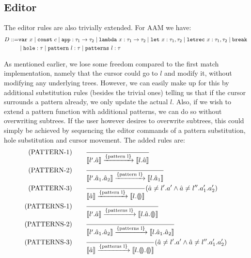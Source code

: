 \documentclass[10pt,a4paper,english]{article}
\begin{document}
\subsection{Editor}
The editor rules are also trivially extended. For AAM we have:
\begin{align}
  D ::= &\texttt{var}~x
  \mid \texttt{const}~c
  \mid \texttt{app} : \tau_1\to\tau_2
  \mid \texttt{lambda}~x : \tau_1\to\tau_2
  \mid \texttt{let}~x : \tau_1,\tau_2
  \mid \texttt{letrec}~x : \tau_1,\tau_2
  \mid \texttt{break}\\
  &\mid \texttt{hole} : \tau
  \mid\texttt{pattern}~l : \tau
  \mid\texttt{patterns}~l : \tau
\end{align}

As mentioned earlier, we lose some freedom compared to the first match implementation, namely that the cursor could go to $l$ and modify it, without modifying any underlying trees. However, we can easily make up for this by additional substitution rules (besides the trivial ones) telling us that if the cursor surrounds a pattern already, we only update the actual $l$. Also, if we wish to extend a pattern function with additional patterns, we can do so without overwriting subtrees. If the user however desires to overwrite subtrees, this could simply be achieved by sequencing the editor commands of a pattern substitution, hole substitution and cursor movement. The added rules are:
\begin{align}
(\text{PATTERN-1})\qquad
&\frac{}{\llbracket l'.\hat{a} \rrbracket\xrightarrow[]{\text{\{pattern l\}}}\llbracket l.\hat{a} \rrbracket}\\
(\text{PATTERN-2})\qquad
&\frac{}{\llbracket l'.\hat{a}_1.\hat{a}_2 \rrbracket\xrightarrow[]{\text{\{pattern l\}}}\llbracket l.\hat{a}_1 \rrbracket}\\
(\text{PATTERN-3})\qquad
&\frac{}{\llbracket \hat{a} \rrbracket\xrightarrow[]{\text{\{pattern l\}}}\llbracket l.\llparenthesis\rrparenthesis \rrbracket}(\hat{a}\neq l'.a' \land \hat{a}\neq l''.a_1'.a_2')\\
(\text{PATTERNS-1})\qquad
&\frac{}{\llbracket l'.\hat{a} \rrbracket\xrightarrow[]{\text{\{patterns l\}}}\llbracket l.\hat{a}.\llparenthesis\rrparenthesis \rrbracket}\\
(\text{PATTERNS-2})\qquad
&\frac{}{\llbracket l'.\hat{a}_1.\hat{a}_2 \rrbracket\xrightarrow[]{\text{\{patterns l\}}}\llbracket l.\hat{a}_1.\hat{a}_2 \rrbracket}\\
(\text{PATTERNS-3})\qquad
&\frac{}{\llbracket \hat{a} \rrbracket\xrightarrow[]{\text{\{patterns l\}}}\llbracket l.\llparenthesis\rrparenthesis.\llparenthesis\rrparenthesis \rrbracket}(\hat{a}\neq l'.a' \land \hat{a}\neq l''.a_1'.a_2')
\end{align}
\end{document}
